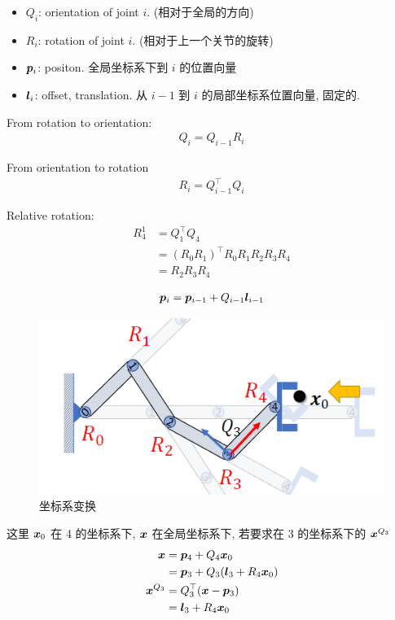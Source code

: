 \begin{itemize}
    \item $Q_i$: orientation of joint $i$.  (相对于全局的方向)
    \item $R_i$: rotation of joint $i$. (相对于上一个关节的旋转)
    \item ${\bm{p}}_i$: positon. 全局坐标系下到 $i$ 的位置向量
    \item ${\bm{l}}_i$: offset, translation. 从 $i-1$ 到 $i$ 的局部坐标系位置向量, 固定的. 
\end{itemize}

From rotation to orientation:
\begin{align*}
    Q_i=Q_{i-1}R_i
\end{align*}

From orientation to rotation
\begin{align*}
    R_i=Q_{i-1}^\top Q_i
\end{align*}

Relative rotation:
\begin{align*}
    R_4^1&=Q_1^\top Q_4\\
    &= (R_0R_1)^\top R_0 R_1 R_2R_3R_4\\
    &=R_2R_3R_4
\end{align*}

\begin{align*}
    {\bm{p}}_i={\bm{p}}_{i-1}+Q_{i-1}{\bm{l}}_{i-1}
\end{align*}

\begin{figure}[!htb]
    \centering
    \includegraphics[width=0.618\linewidth]{pic/1053/反向求解}
    \caption{坐标系变换}
\end{figure}
这里 ${\bm{x}}_0$ 在 4 的坐标系下, ${\bm{x}}$ 在全局坐标系下, 若要求在 3 的坐标系下的 ${\bm{x}}^{Q_3}$
\begin{align*}
    \bm x&={\bm{p}}_4+Q_4{\bm{x}}_0\\
    &={\bm{p}}_3+Q_3({\bm{l}}_3+R_4{\bm{x}}_0)\\
    {\bm{x}}^{Q_3}&=Q_3^\top({\bm{x}}-{\bm{p}}_3)\\
    &={\bm{l}}_3+R_4{\bm{x}}_0
\end{align*}



